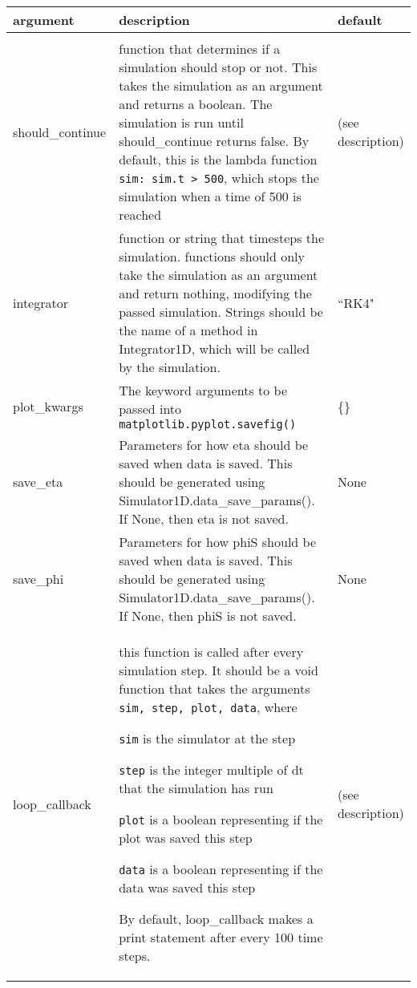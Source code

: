 \documentclass[10pt,a4paper]{article}
\newenvironment{optarglist}
    {\begin{center}
    \begin{tabular}{l|p{10cm}|l}
    argument & description & default\\
    \hline\\
    }
    { 
    \end{tabular} 
    \end{center}
    }
\begin{document}
\begin{optarglist}
should\_continue &
                   function that determines if a simulation should stop or
                    not. This takes the simulation as an argument and returns a
                    boolean. The simulation is run until should\_continue
                    returns false. By default, this is the lambda function
                    \texttt{sim: sim.t > 500}, which stops the simulation when a time of 500 is reached & (see description)\\\hline
integrator &
function or string that timesteps the simulation.
                    functions should only take the simulation as an argument
                    and return nothing, modifying the passed simulation.
                    Strings should be the name of a method in Integrator1D,
                    which will be called by the simulation. &
                    ``RK4"\\\hline
plot\_kwargs &
The keyword arguments to be passed into
                    \texttt{matplotlib.pyplot.savefig()} & \{\} \\\hline

save\_eta &
                   Parameters for how eta should be saved when data is saved.
                    This should be generated using
                    Simulator1D.data\_save\_params(). If None, then eta is not
                    saved. & None\\\hline
        
        save\_phi &
                   Parameters for how phiS should be saved when data is saved.
                    This should be generated using
                    Simulator1D.data\_save\_params(). If None, then phiS is not
                    saved. & None\\\hline

        loop\_callback &
                   this function is called after every simulation step. It
                    should be a void function that takes the arguments
                    \texttt{sim, step, plot, data}, where

                    \texttt{sim} is the simulator at the step

                    \texttt{step} is the integer multiple of dt that the simulation
                    has run

                    \texttt{plot} is a boolean representing if the plot was saved this
                    step

                    \texttt{data} is a boolean representing if the data was saved this
                    step
                    
                    By default, loop\_callback makes a print statement after
                    every 100 time steps. & (see description)\\\hline
\end{optarglist}
\end{document}
